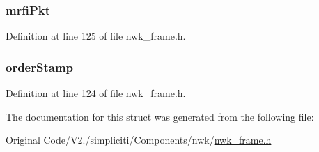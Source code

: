 \hypertarget{structframeInfo__t_ac7a6c4fea11f56eda913e5c5b1092aa5}{
\subsubsection[{mrfi\-Pkt}]{ {\bf mrfi\-Pkt}}}\label{structframeInfo__t_ac7a6c4fea11f56eda913e5c5b1092aa5}


\-Definition at line 125 of file nwk\-\_\-frame.\-h.

\hypertarget{structframeInfo__t_a67b3ffbf7c3dc9ca9c1b6399c3e478a1}{
\subsubsection[{order\-Stamp}]{ {\bf order\-Stamp}}}\label{structframeInfo__t_a67b3ffbf7c3dc9ca9c1b6399c3e478a1}


\-Definition at line 124 of file nwk\-\_\-frame.\-h.



\-The documentation for this struct was generated from the following file\-:\begin{DoxyCompactItemize}
\item 
\-Original Code/\-V2./simpliciti/\-Components/nwk/\hyperlink{nwk__frame_8h}{nwk\-\_\-frame.\-h}\end{DoxyCompactItemize}
